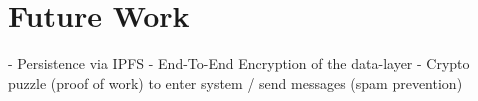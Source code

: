 \section{Future Work}
- Persistence via IPFS
- End-To-End Encryption of the data-layer
- Crypto puzzle (proof of work) to enter system / send messages (spam prevention)